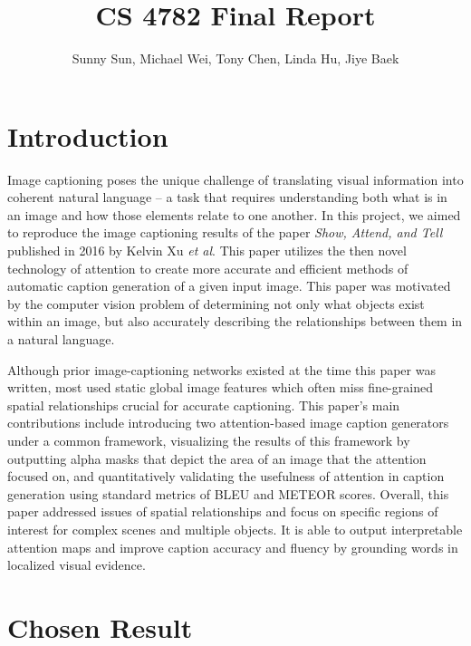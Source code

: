 \documentclass{article}
\title{\vspace{0cm}\myfont CS 4782 Final Report}
\author{Sunny Sun, Michael Wei, Tony Chen, Linda Hu, Jiye Baek}
\begin{document}
\maketitle

\section{Introduction}


Image captioning poses the unique challenge of translating visual information into coherent natural language -- a task that requires understanding both what is in an image and how those elements relate to one another. In this project, we aimed to reproduce the image captioning results of the paper \textit{Show, Attend, and Tell} published in 2016 by Kelvin Xu \textit{et al}. This paper utilizes the then novel technology of attention to create more accurate and efficient methods of automatic caption generation of a given input image. This paper was motivated by the computer vision problem of determining not only what objects exist within an image, but also accurately describing the relationships between them in a natural language.

Although prior image-captioning networks existed at the time this paper was written, most used static global image features which often miss fine-grained spatial relationships crucial for accurate captioning. This paper's main contributions include introducing two attention-based image caption generators under a common framework, visualizing the results of this framework by outputting alpha masks that depict the area of an image that the attention focused on, and quantitatively validating the usefulness of attention in caption generation using standard metrics of BLEU and METEOR scores. Overall, this paper addressed issues of spatial relationships and focus on specific regions of interest for complex scenes and multiple objects. It is able to output interpretable attention maps and improve caption accuracy and fluency by grounding words in localized visual evidence.

\section{Chosen Result}

\end{document}
